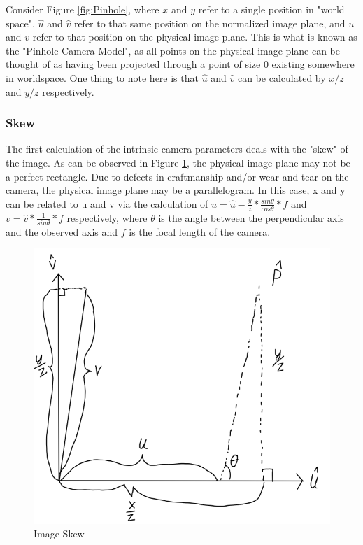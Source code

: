 Consider Figure \ref{fig:Pinhole}, where $x$ and $y$ refer to a single position in "world space", $\hat{u}$ and $\hat{v}$ refer to that same position on the normalized image plane, and $u$ and $v$ refer to that position on the physical image plane.  This is what is known as the "Pinhole Camera Model", as all points on the physical image plane can be thought of as having been projected through a point of size 0 existing somewhere in worldspace.  One thing to note here is that $\hat{u}$ and $\hat{v}$ can be calculated by $x/z$ and $y/z$ respectively.
\subsubsection{Skew}
The first calculation of the intrinsic camera parameters deals with the "skew" of the image.  As can be observed in Figure \ref{fig:Skew}, the physical image plane may not be a perfect rectangle.  Due to defects in craftmanship and/or wear and tear on the camera, the physical image plane may be a parallelogram.  In this case, x and y can be related to u and v via the calculation of $u=\hat{u}-\frac{y}{z} * \frac{sin  \theta }{ cos \theta} * f$ and $v=\hat{v}*\frac{1}{sin \theta} * f$ respectively, where $\theta$ is the angle between the perpendicular axis and the observed axis and $f$ is the focal length of the camera.
\begin{figure}[h!]
	\includegraphics[scale=.5]{Image2}
	\caption{Image Skew}
	\label{fig:Skew}
\end{figure}
